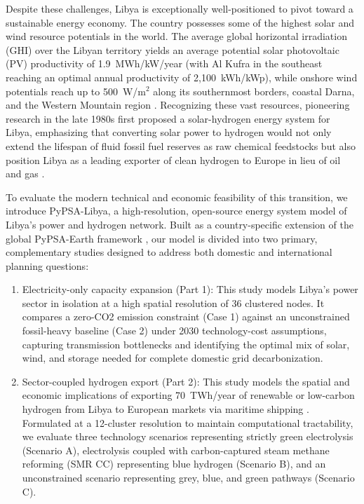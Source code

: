 \documentclass[preprint,12pt]{elsarticle}
\begin{document}
Despite these challenges, Libya is exceptionally well-positioned to pivot toward a sustainable energy economy. The country possesses some of the highest solar and wind resource potentials in the world. The average global horizontal irradiation (GHI) over the Libyan territory yields an average potential solar photovoltaic (PV) productivity of 1.9~MWh/kW/year (with Al Kufra in the southeast reaching an optimal annual productivity of 2,100~kWh/kWp), while onshore wind potentials reach up to 500~W/m$^2$ along its southernmost borders, coastal Darna, and the Western Mountain region \cite{almaktar2021prospects}. Recognizing these vast resources, pioneering research in the late 1980s first proposed a solar-hydrogen energy system for Libya, emphasizing that converting solar power to hydrogen would not only extend the lifespan of fluid fossil fuel reserves as raw chemical feedstocks but also position Libya as a leading exporter of clean hydrogen to Europe in lieu of oil and gas \cite{eljrushi1990solar}. 

To evaluate the modern technical and economic feasibility of this transition, we introduce \textsf{PyPSA-Libya}, a high-resolution, open-source energy system model of Libya's power and hydrogen network. Built as a country-specific extension of the global \textsf{PyPSA-Earth} framework \cite{abdelkhalek2025pypsa}, our model is divided into two primary, complementary studies designed to address both domestic and international planning questions:
\begin{enumerate}
    \item {Electricity-only capacity expansion (Part 1):} This study models Libya's power sector in isolation at a high spatial resolution of 36 clustered nodes. It compares a zero-CO2 emission constraint (Case 1) against an unconstrained fossil-heavy baseline (Case 2) under 2030 technology-cost assumptions, capturing transmission bottlenecks and identifying the optimal mix of solar, wind, and storage needed for complete domestic grid decarbonization.
    \item {Sector-coupled hydrogen export (Part 2):} This study models the spatial and economic implications of exporting 70~TWh/year of renewable or low-carbon hydrogen from Libya to European markets via maritime shipping \cite{abdelkhalek2025pypsa}. Formulated at a 12-cluster resolution to maintain computational tractability, we evaluate three technology scenarios representing strictly green electrolysis (Scenario A), electrolysis coupled with carbon-captured steam methane reforming (SMR CC) representing blue hydrogen (Scenario B), and an unconstrained scenario representing grey, blue, and green pathways (Scenario C).
\end{enumerate}
\end{document}
